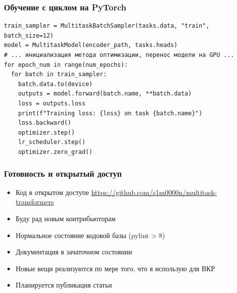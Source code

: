 \documentclass[aspectratio=169]{beamer}
\begin{document}
\begin{frame}[fragile]
	\frametitle{Обучение с циклом на PyTorch}
	\begin{verbatim}
train_sampler = MultitaskBatchSampler(tasks.data, "train", batch_size=12)
model = MultitaskModel(encoder_path, tasks.heads)
# ... инициализация метода оптимизации, перенос модели на GPU ...
for epoch_num in range(num_epochs):
  for batch in train_sampler:
    batch.data.to(device)
    outputs = model.forward(batch.name, **batch.data)
    loss = outputs.loss
    print(f"Training loss: {loss} on task {batch.name}")
    loss.backward()
    optimizer.step()
    lr_scheduler.step()
    optimizer.zero_grad()
	\end{verbatim}
\end{frame}


\begin{frame}
	\frametitle{Готовность и открытый доступ}
	\begin{itemize}
		\item Код в открытом доступе \url{https://github.com/s1m0000n/multitask-transformers}
		\item Буду рад новым контрибьюторам
		\item Нормальное состояние кодовой базы (pylint > 8)
		\item Документация в зачаточном состоянии
		\item Новые вещи реализуются по мере того, что я использую для ВКР
		\item Планируется публикация статьи
	\end{itemize}
\end{frame}







	

\end{document}
